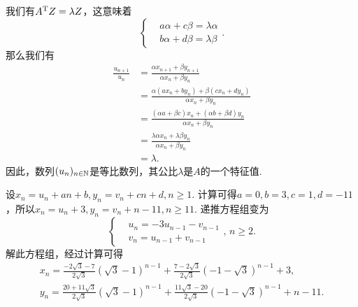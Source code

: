 \begin{solution}
  我们有$A^{\mathrm T} Z=\lambda Z$，这意味着
  \[
    \left\{
      \begin{aligned}
        & a\alpha + c\beta = \lambda\alpha \\
        & b\alpha + d\beta = \lambda\beta
      \end{aligned}
    \right..
  \]
  那么我们有
  \begin{align*}
    \frac{u_{n+1}}{u_n} & = \frac{\alpha x_{n+1}+\beta y_{n+1}}{\alpha x_n+\beta y_n} \\
    & = \frac{\alpha(ax_n+by_n)+\beta(cx_n+dy_n)}
    {\alpha x_n+\beta y_n} \\
    & = \frac{(\alpha a+\beta c)x_n+(\alpha b+\beta d)y_n}{\alpha x_n+\beta y_n} \\
    & = \frac{\lambda \alpha x_n + \lambda\beta y_n}{\alpha x_n+\beta y_n} \\
    & = \lambda.
  \end{align*}
  因此，数列$(u_n)_{n\in\mathbb N}$是等比数列，其公比$\lambda$是$A$的一个特征值.
\end{solution}

\begin{solution}
  设$x_n=u_n+an+b,y_n=v_n+cn+d,n\ge1$. 计算可得$a=0,b=3,c=1,d=-11$，所以$x_n=u_n+3,y_n=v_n+n-11,n\ge11$. 递推方程组变为
  \[
    \left\{
      \begin{aligned}
        & u_n = -3u_{n-1} - v_{n-1} \\
        & v_n = u_{n-1} + v_{n-1}
      \end{aligned}
    \right.,\,n\ge2.
  \]
  解此方程组，经过计算可得
  \begin{gather*}
    x_n = \frac{-2\sqrt3-7}{2\sqrt3}(\sqrt3-1)
        ^{n-1}+\frac{7-2\sqrt3}{2\sqrt3}(-1-\sqrt3)
        ^{n-1}+3, \\
    y_n = \frac{20+11\sqrt3}{2\sqrt3} (\sqrt3-1)^{n-1} + \frac{11\sqrt3-20}{2\sqrt3}
    (-1 - \sqrt3)^{n-1} + n - 11.
  \end{gather*}
\end{solution}

